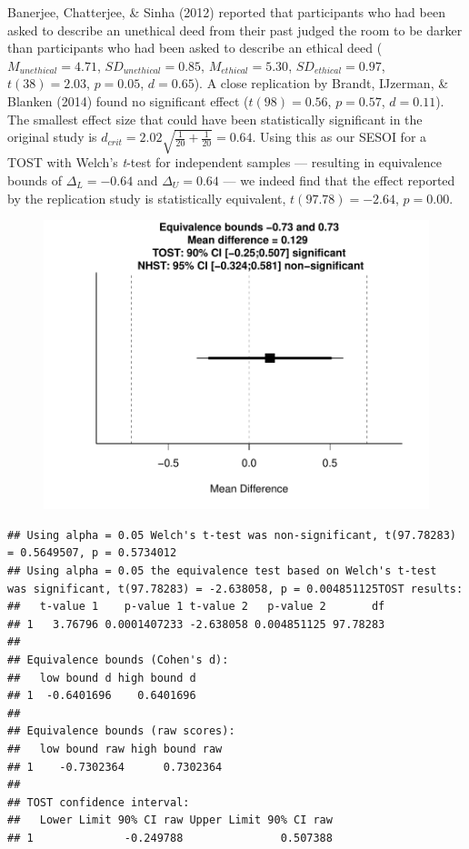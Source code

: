 \documentclass[english,man]{apa6}
\theoremstyle{definition}
\theoremstyle{definition}
\theoremstyle{definition}
\theoremstyle{remark}
\begin{document}
Banerjee, Chatterjee, \& Sinha (2012) reported that participants who had
been asked to describe an unethical deed from their past judged the room
to be darker than participants who had been asked to describe an ethical
deed (\(M_{unethical}= 4.71\), \({SD}_{unethical}= 0.85\),
\(M_{ethical}=5.30\), \({SD}_{ethical}=0.97\), \(t(38)= 2.03\),
\(p= 0.05\), \(d= 0.65\)). A close replication by Brandt, IJzerman, \&
Blanken (2014) found no significant effect (\(t(98)=0.56\), \(p=0.57\),
\(d=0.11\)). The smallest effect size that could have been statistically
significant in the original study is
\(d_{crit}= 2.02 \sqrt { \frac { 1} {20} + \frac { 1} {20} }=0.64\).
Using this as our SESOI for a TOST with Welch's \emph{t}-test for
independent samples --- resulting in equivalence bounds of
\({\Delta}_L=-0.64\) and \({\Delta}_U=0.64\) --- we indeed find that the
effect reported by the replication study is statistically equivalent,
\(t(97.78)=-2.64\), \(p=0.00\).

\begin{figure}[htbp]
\centering
\includegraphics{manuscript_files/figure-latex/unnamed-chunk-6-1.pdf}
\caption{}
\end{figure}

\begin{verbatim}
## Using alpha = 0.05 Welch's t-test was non-significant, t(97.78283) = 0.5649507, p = 0.5734012
## Using alpha = 0.05 the equivalence test based on Welch's t-test  was significant, t(97.78283) = -2.638058, p = 0.004851125TOST results:
##   t-value 1    p-value 1 t-value 2   p-value 2       df
## 1   3.76796 0.0001407233 -2.638058 0.004851125 97.78283
## 
## Equivalence bounds (Cohen's d):
##   low bound d high bound d
## 1  -0.6401696    0.6401696
## 
## Equivalence bounds (raw scores):
##   low bound raw high bound raw
## 1    -0.7302364      0.7302364
## 
## TOST confidence interval:
##   Lower Limit 90% CI raw Upper Limit 90% CI raw
## 1              -0.249788               0.507388
\end{verbatim}
\end{document}
